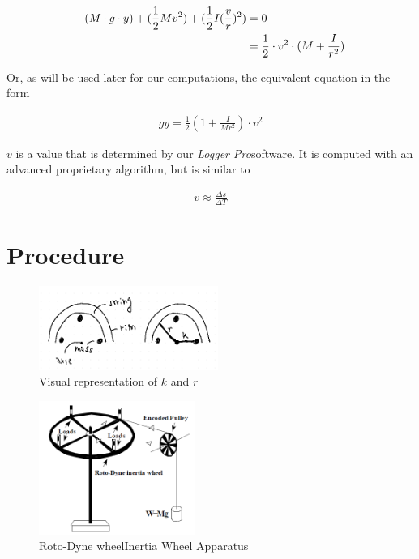 \documentclass[coverpage]{article}
\newcommand{\softwareText}[1]{\textit{#1}\texttrademark}
\newcommand{\loggerpro}{\softwareText{Logger Pro}}
\newcommand{\rwheel}{Roto-Dyne wheel}
\begin{document}
	\begin{align}
		-(M \cdot g \cdot y) + (\frac{1}{2} M v^2) + (\frac{1}{2} I (\frac{v}{r})^2)&=0 \notag \\
		&=\frac{1}{2} \cdot v^2 \cdot (M + \frac{I}{r^2})
	\end{align}

	Or, as will be used later for our computations, the equivalent equation in the form
	
	\begin{align}
		gy = \frac{1}{2}(1 + \frac{I}{Mr^2}) \cdot v^2 \label{eq:conservation-of-energy-gy-form}
	\end{align}
	
	$v$ is a value that is determined by our \loggerpro software. It is computed with an advanced proprietary algorithm, but is similar to
	
	\begin{align}
		v \approx \frac{\Delta{s}}{\Delta{T}} \label{eq:delta-s-delta-t}
	\end{align}
	
	\section{Procedure}
	
	\begin{figure}
		\centering
		\caption{Visual representation of $k$ and $r$}
		\includegraphics[width=2.3in]{graphics/rAndK.png}
	\end{figure}

	\begin{figure}
		\label{fig:apparatus}
		\caption{\rwheel Inertia Wheel Apparatus \cite{labManual}}
		\centering
		\includegraphics[width=2in]{graphics/apparatus.png}
	\end{figure}
\end{document}
